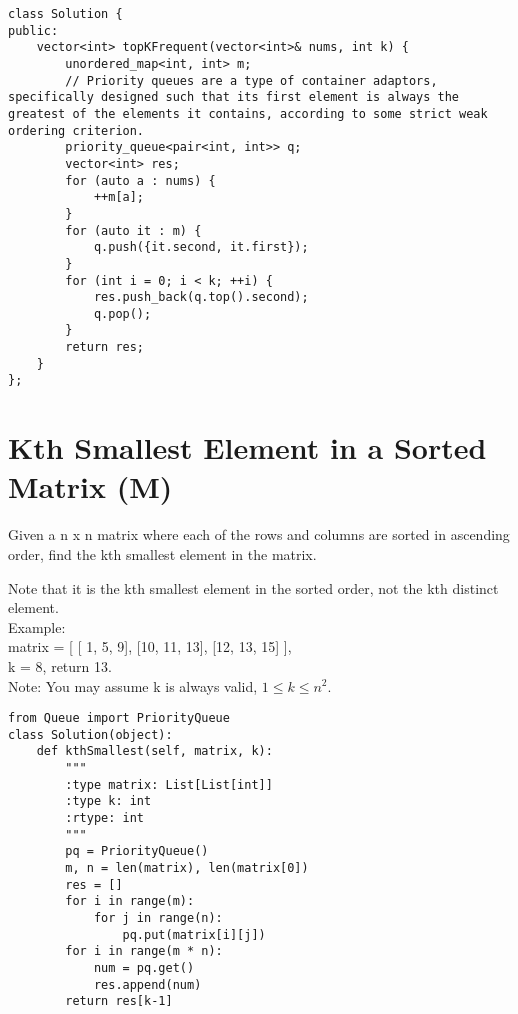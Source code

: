 \begin{lstlisting}
class Solution {
public:
    vector<int> topKFrequent(vector<int>& nums, int k) {
        unordered_map<int, int> m;
        // Priority queues are a type of container adaptors, specifically designed such that its first element is always the greatest of the elements it contains, according to some strict weak ordering criterion.
        priority_queue<pair<int, int>> q;
        vector<int> res;
        for (auto a : nums) {
            ++m[a];
        }
        for (auto it : m) {
            q.push({it.second, it.first});
        }
        for (int i = 0; i < k; ++i) {
            res.push_back(q.top().second); 
            q.pop();
        }
        return res;
    }
};
\end{lstlisting}

\section{Kth Smallest Element in a Sorted Matrix (M)}
Given a n x n matrix where each of the rows and columns are sorted in ascending order, find the kth smallest element in the matrix.\

Note that it is the kth smallest element in the sorted order, not the kth distinct element.\\

Example:\\
matrix = [
   [ 1,  5,  9],
   [10, 11, 13],
   [12, 13, 15]
],\\
k = 8, return 13.\\

Note:
You may assume k is always valid, $1 \leq k \leq n^2$.\\

\begin{lstlisting}
from Queue import PriorityQueue
class Solution(object):
    def kthSmallest(self, matrix, k):
        """
        :type matrix: List[List[int]]
        :type k: int
        :rtype: int
        """
        pq = PriorityQueue()
        m, n = len(matrix), len(matrix[0])
        res = []
        for i in range(m):
            for j in range(n):
                pq.put(matrix[i][j])
        for i in range(m * n):
            num = pq.get()
            res.append(num)
        return res[k-1]
\end{lstlisting}


